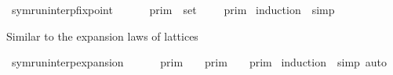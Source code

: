 \begin{isabellebody}
\begin{isamarkuptext}
\end{isamarkuptext}\isamarkuptrue%
\isamarkupfalse%
\ symrun{\isacharunderscore}interp{\isacharunderscore}fixpoint{\isacharcolon}\isanewline
\ \ {\isacartoucheopen}{\isasymInter}\ {\isacharparenleft}{\isacharparenleft}{\isasymlambda}{\isasymgamma}{\isachardot}\ {\isasymlbrakk}\ {\isasymgamma}\ {\isasymrbrakk}\isactrlsub p\isactrlsub r\isactrlsub i\isactrlsub m{\isacharparenright}\ {\isacharbackquote}\ set\ {\isasymGamma}{\isacharparenright}\ {\isacharequal}\ {\isasymlbrakk}{\isasymlbrakk}\ {\isasymGamma}\ {\isasymrbrakk}{\isasymrbrakk}\isactrlsub p\isactrlsub r\isactrlsub i\isactrlsub m{\isacartoucheclose}\isanewline
%
\isadelimproof
%
\endisadelimproof
%
\isatagproof
{}\isamarkupfalse%
\ {\isacharparenleft}induction\ {\isasymGamma}{\isacharcomma}\ simp{\isacharplus}{\isacharparenright}%
\endisatagproof
{\isafoldproof}%
%
\isadelimproof
%
\endisadelimproof
%
\isadelimdocument
%
\endisadelimdocument
%
\isatagdocument
%
\isamarkuptrue%
%
\endisatagdocument
{\isafolddocument}%
%
\isadelimdocument
%
\endisadelimdocument
%
\begin{isamarkuptext}%
Similar to the expansion laws of lattices%
\end{isamarkuptext}\isamarkuptrue%
\isamarkupfalse%
\ symrun{\isacharunderscore}interp{\isacharunderscore}expansion{\isacharcolon}\isanewline
\ \ {\isacartoucheopen}{\isasymlbrakk}{\isasymlbrakk}\ {\isasymGamma}\ {\isacharat}\ {\isasymGamma}\ {\isasymrbrakk}{\isasymrbrakk}\isactrlsub p\isactrlsub r\isactrlsub i\isactrlsub m\ {\isacharequal}\ {\isasymlbrakk}{\isasymlbrakk}\ {\isasymGamma}\ {\isasymrbrakk}{\isasymrbrakk}\isactrlsub p\isactrlsub r\isactrlsub i\isactrlsub m\ {\isasyminter}\ {\isasymlbrakk}{\isasymlbrakk}\ {\isasymGamma}\ {\isasymrbrakk}{\isasymrbrakk}\isactrlsub p\isactrlsub r\isactrlsub i\isactrlsub m{\isacartoucheclose}\isanewline
%
\isadelimproof
%
\endisadelimproof
%
\isatagproof
{}\isamarkupfalse%
\ {\isacharparenleft}induction\ {\isasymGamma}\ simp{\isacharcomma}\ auto{\isacharparenright}%
\endisatagproof
{\isafoldproof}%
%
\isadelimproof
%
\endisadelimproof
%
\isadelimdocument
%
\endisadelimdocument
%
\isatagdocument
%
\isamarkuptrue%
%
\isamarkuptrue%
%
\endisatagdocument
{\isafolddocument}%

\end{isabellebody}
